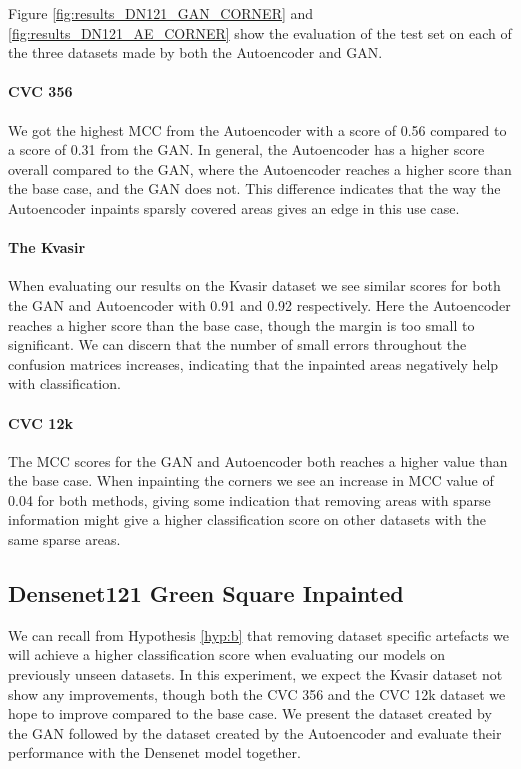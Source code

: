 %
\noindent Figure \ref{fig:results_DN121_GAN_CORNER} and \ref{fig:results_DN121_AE_CORNER} show the evaluation of the test set on each of the three datasets made by both the Autoencoder and GAN. 

\paragraph{CVC 356}
We got the highest MCC from the Autoencoder with a score of 0.56 compared to a score of 0.31 from the GAN.
In general, the Autoencoder has a higher score overall compared to the GAN, where the Autoencoder reaches a higher score than the base case, and the GAN does not.
This difference indicates that the way the Autoencoder inpaints sparsly covered areas gives an edge in this use case. 


\paragraph{The Kvasir}
When evaluating our results on the Kvasir dataset we see similar scores for both the GAN and Autoencoder with 0.91 and 0.92 respectively. Here the Autoencoder reaches a higher score than the base case, though the margin is too small to significant.
We can discern that the number of small errors throughout the confusion matrices increases, indicating that the inpainted areas negatively help with classification.

\paragraph{CVC 12k}
The MCC scores for the GAN and Autoencoder both reaches a higher value than the base case. When inpainting the corners we see an increase in MCC value of 0.04 for both methods, giving some indication that removing areas with sparse information might give a higher classification score on other datasets with the same sparse areas.
















\subsection{Densenet121 Green Square Inpainted}


We can recall from Hypothesis \ref{hyp:b} that removing dataset specific artefacts we will achieve a higher classification score when evaluating our models on previously unseen datasets.
In this experiment, we expect the Kvasir dataset not show any improvements, though both the CVC 356 and the CVC 12k dataset we hope to improve compared to the base case. 
We present the dataset created by the GAN followed by the dataset created by the Autoencoder and evaluate their performance with the Densenet model together.


